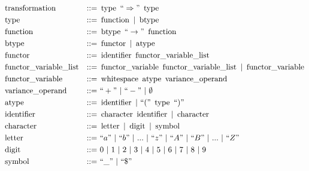 \documentclass[../Dissertation.tex]{subfiles}
\begin{document}
\begin{align*}
  &\transformterminal &::=&\ \typeterminal\ ``\Rightarrow"\ \typeterminal\\
  &\typeterminal &::=&\ \functionterminal\ |\ \btypeterminal\\
  &\functionterminal &::=&\ \btypeterminal\ ``\rightarrow"\ \functionterminal\\
  &\btypeterminal &::=&\ \functorterminal\ |\ \atypeterminal\\
  &\functorterminal &::=&\ \identifierterminal\ \variablelistterminal\\
  &\variablelistterminal &::=&\ \variableterminal\ \variablelistterminal\ |\ \variableterminal\\
  &\variableterminal &::=&\ \whitespaceterminal\ \atypeterminal\ \varianceterminal\\
  &\varianceterminal &::=&\ ``+"\ |\ ``-"\ |\ \emptyset\\
  &\atypeterminal &::=&\ \identifierterminal\ |\ ``("\ \typeterminal\ ``)"\\
  &\identifierterminal &::=&\ \characterterminal\ \identifierterminal\ |\ \characterterminal\\
  &\characterterminal &::=&\ \letterterminal\ |\ \digitterminal\ |\ \symbolterminal\\
  &\letterterminal &::=&\ ``a"\ |\ ``b"\ |\ ...\ |\ ``z"\ |\ ``A"\ |\ ``B"\ |\ ...\ |\ ``Z"\\
  &\digitterminal &::=&\ 0\ |\ 1\ |\ 2\ |\ 3\ |\ 4\ |\ 5\ |\ 6\ |\ 7\ |\ 8\ |\ 9\\
  &\symbolterminal &::=&\ ``\_"\ |\ ``\$"
\end{align*}
\end{document}
